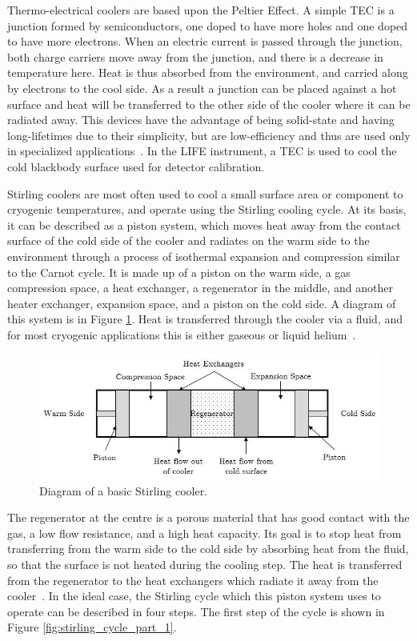 Thermo-electrical coolers are based upon the Peltier Effect. A simple TEC is a junction formed by semiconductors, one doped to have more holes and one doped to have more electrons. When an electric current is passed through the junction, both charge carriers move away from the junction, and there is a decrease in temperature here. Heat is thus absorbed from the environment, and carried along by electrons to the cool side. As a result a junction can be placed against a hot surface and heat will be transferred to the other side of the cooler where it can be radiated away. This devices have the advantage of being solid-state and having long-lifetimes due to their simplicity, but are low-efficiency and thus are used only in specialized applications~\citep{TE_coolers}. In the LIFE instrument, a TEC is used to cool the cold blackbody surface used for detector calibration.

Stirling coolers are most often used to cool a small surface area or component to cryogenic temperatures, and operate using the Stirling cooling cycle. At its basis, it can be described as a piston system, which moves heat away from the contact surface of the cold side of the cooler and radiates on the warm side to the environment through a process of isothermal expansion and compression similar to the Carnot cycle. It is made up of a piston on the warm side, a gas compression space, a heat exchanger, a regenerator in the middle, and another heater exchanger, expansion space, and a piston on the cold side. A diagram of this system is in Figure \ref{fig:stirling_cooler}. Heat is transferred through the cooler via a fluid, and for most cryogenic applications this is either gaseous or liquid helium~\citep{cryocoolers}.

\begin{figure}
\centering
  \includegraphics[width=\linewidth]{chap2_images/stirling_cooler.JPG}
  \caption{Diagram of a basic Stirling cooler.}
  \label{fig:stirling_cooler}
\end{figure}

The regenerator at the centre is a porous material that has good contact with the gas, a low flow resistance, and a high heat capacity. Its goal is to stop heat from transferring from the warm side to the cold side by absorbing heat from the fluid, so that the surface is not heated during the cooling step. The heat is transferred from the regenerator to the heat exchangers which radiate it away from the cooler~\citep{cryocoolers}.  In the ideal case, the Stirling cycle which this piston system uses to operate can be described in four steps. The first step of the cycle is shown in Figure \ref{fig:stirling_cycle_part_1}.

